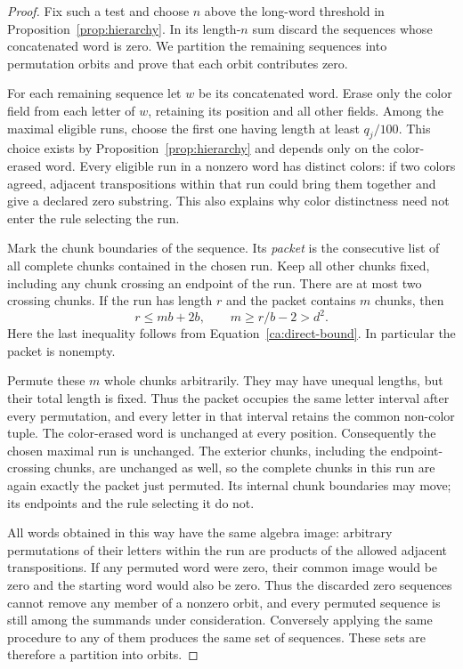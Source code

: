 \begin{proof}
Fix such a test and choose $n$ above the long-word threshold in
Proposition~\ref{prop:hierarchy}.  In its length-$n$ sum discard the
sequences whose concatenated word is zero.  We partition the remaining
sequences into permutation orbits and prove that each orbit contributes
zero.

For each remaining sequence let $w$ be its concatenated word.  Erase only
the color field from each letter of $w$, retaining its position and all
other fields. Among the maximal eligible runs, choose the first one
having length at least $q_j/100$. This choice exists by
Proposition~\ref{prop:hierarchy} and depends only on the color-erased
word.  Every eligible run in a nonzero word has distinct colors: if two
colors agreed, adjacent transpositions within that run could bring them
together and give a declared zero substring.  This also explains why
color distinctness need not enter the rule selecting the run.

Mark the chunk boundaries of the sequence.  Its \emph{packet} is the
consecutive list of all complete chunks contained in the chosen run.
Keep all other chunks fixed, including any chunk crossing an endpoint of
the run.  There are at most two crossing chunks.  If the run has length
$r$ and the packet contains $m$ chunks, then
\[
  r\leq mb+2b,\qquad
  m\geq r/b-2>d^2.
\]
Here the last inequality follows from Equation~\eqref{ca:direct-bound}.
In particular the packet is nonempty.

Permute these $m$ whole chunks arbitrarily.  They may have unequal
lengths, but their total length is fixed.  Thus the packet occupies the
same letter interval after every permutation, and every letter in that
interval retains the common non-color tuple.  The color-erased word is
unchanged at every position.  Consequently the chosen maximal run is
unchanged.  The exterior chunks, including the endpoint-crossing chunks,
are unchanged as well, so the complete chunks in this run are again
exactly the packet just permuted.  Its internal chunk boundaries may
move; its endpoints and the rule selecting it do not.

All words obtained in this way have the same algebra image: arbitrary
permutations of their letters within the run are products of the allowed
adjacent transpositions.  If any permuted word were zero, their common
image would be zero and the starting word would also be zero.  Thus the
discarded zero sequences cannot remove any member of a nonzero orbit,
and every permuted sequence is still among the summands under
consideration.  Conversely applying
the same procedure to any of them produces the same set of sequences.
These sets are therefore a partition into orbits.


\end{proof}
